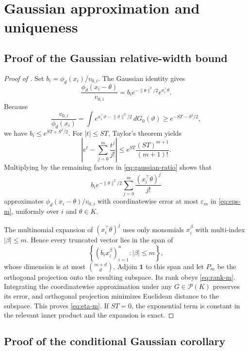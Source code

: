 \documentclass[11pt]{article}
\theoremstyle{definition}
\theoremstyle{remark}
\newcommand{\Pcal}{\mathcal P}
\newcommand{\one}{\bm 1}
\newcommand{\norm}[1]{\lVert #1\rVert}
\newcommand{\abs}[1]{\lvert #1\rvert}
\newcommand{\eps}{\varepsilon}
\begin{document}
\section{Gaussian approximation and uniqueness}
\label{app:gaussian}

\subsection{Proof of the Gaussian relative-width bound}

\begin{proof}[Proof of ]
Set $b_i=\phi_d(x_i)/v_{0,i}$.  The Gaussian identity gives
\begin{equation}\label{eq:gaussian-ratio}
 \frac{\phi_d(x_i-\theta)}{v_{0,i}}
 =b_i e^{-\norm{\theta}^2/2}e^{x_i^\top\theta}.
\end{equation}
Because
\[
 \frac{v_{0,i}}{\phi_d(x_i)}
 =\int e^{x_i^\top\vartheta-\norm{\vartheta}^2/2}\,dG_0(\vartheta)
 \ge e^{-ST-S^2/2},
\]
we have $b_i\le e^{ST+S^2/2}$.  For $\abs{t}\le ST$, Taylor's theorem yields
\[
 \left|e^t-\sum_{j=0}^m\frac{t^j}{j!}\right|
 \le e^{ST}\frac{(ST)^{m+1}}{(m+1)!}.
\]
Multiplying by the remaining factors in \eqref{eq:gaussian-ratio} shows that
\[
 b_i e^{-\norm{\theta}^2/2}
 \sum_{j=0}^m\frac{(x_i^\top\theta)^j}{j!}
\]
approximates $\phi_d(x_i-\theta)/v_{0,i}$ with coordinatewise error at most
$\eps_m$ in \eqref{eq:eps-m}, uniformly over $i$ and $\theta\in K$.

The multinomial expansion of $(x_i^\top\theta)^j$ uses only monomials
$x_i^\beta$ with multi-index $\abs{\beta}\le m$.  Hence every truncated vector
lies in the span of
\[
 \left\{(b_ix_i^\beta)_{i=1}^n:\abs{\beta}\le m\right\},
\]
whose dimension is at most $\binom{m+d}{d}$.  Adjoin $\one$ to this span and
let $P_m$ be the orthogonal projection onto the resulting subspace.  Its rank
obeys \eqref{eq:rank-m}.  Integrating the coordinatewise approximation under
any $G\in\Pcal(K)$ preserves its error, and orthogonal projection minimizes
Euclidean distance to the subspace.  This proves \eqref{eq:eta-m}.  If
$ST=0$, the exponential term is constant in the relevant inner product and
the expansion is exact.
\end{proof}

\subsection{Proof of the conditional Gaussian corollary}
\end{document}
